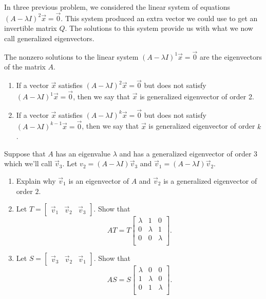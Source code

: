 In three previous problem, we considered the linear system of equations $(A-\lambda I)^2\vec x=\vec 0$. This system produced an extra vector we could use to get an invertible matrix $Q$. The solutions to this system provide us with what we now call generalized eigenvectors.
\begin{definition}
 The nonzero solutions to the linear system $(A-\lambda I)^1\vec x=\vec 0$ are the eigenvectors of the matrix $A$.  
\begin{enumerate}
 \item If a vector 
$\vec x$ satisfies $(A-\lambda I)^2\vec x=\vec 0$ but does not satisfy $(A-\lambda I)^1\vec x=\vec 0$, then we say that $\vec x$ is generalized eigenvector of order 2. 
 \item If a vector 
$\vec x$ satisfies $(A-\lambda I)^k\vec x=\vec 0$ but does not satisfy $(A-\lambda I)^{k-1}\vec x=\vec 0$, then we say that $\vec x$ is generalized eigenvector of order $k$. 
\end{enumerate}
\end{definition}


\begin{problem}
 Suppose that $A$ has an eigenvalue $\lambda$ and has a generalized eigenvector of order $3$ which we'll call $\vec v_3$. Let $v_2 = (A-\lambda I)\vec v_3$ and $\vec v_1 = (A-\lambda I)\vec v_2$.   
\begin{enumerate}
 \item Explain why $\vec v_1$ is an eigenvector of $A$ and  $\vec v_2$ is a generalized eigenvector of order $2$. 
 \item {}
Let $T = \begin{bmatrix} \vec v_1&\vec v_2&\vec v_3\end{bmatrix}$. Show that 
$$A T= 
T
\begin{bmatrix}
\lambda & 1&0\\
0&\lambda & 1\\
0&0&\lambda\\
\end{bmatrix}.
$$
 \item Let $ S = \begin{bmatrix} \vec v_3&\vec v_2&\vec v_1\end{bmatrix}$. Show that 
$$A S = 
S
\begin{bmatrix}
\lambda & 0&0\\
1&\lambda & 0\\
0&1&\lambda\\
\end{bmatrix}.
$$
\end{enumerate}
\end{problem}



